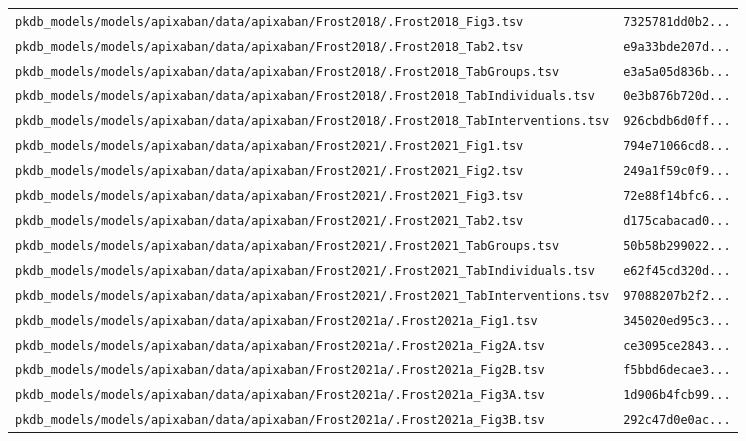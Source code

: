 \begin{longtable}{ll}
\texttt{pkdb\_models/models/apixaban/data/apixaban/Frost2018/.Frost2018\_Fig3.tsv} & \texttt{7325781dd0b2...} \\
\texttt{pkdb\_models/models/apixaban/data/apixaban/Frost2018/.Frost2018\_Tab2.tsv} & \texttt{e9a33bde207d...} \\
\texttt{pkdb\_models/models/apixaban/data/apixaban/Frost2018/.Frost2018\_TabGroups.tsv} & \texttt{e3a5a05d836b...} \\
\texttt{pkdb\_models/models/apixaban/data/apixaban/Frost2018/.Frost2018\_TabIndividuals.tsv} & \texttt{0e3b876b720d...} \\
\texttt{pkdb\_models/models/apixaban/data/apixaban/Frost2018/.Frost2018\_TabInterventions.tsv} & \texttt{926cbdb6d0ff...} \\
\texttt{pkdb\_models/models/apixaban/data/apixaban/Frost2021/.Frost2021\_Fig1.tsv} & \texttt{794e71066cd8...} \\
\texttt{pkdb\_models/models/apixaban/data/apixaban/Frost2021/.Frost2021\_Fig2.tsv} & \texttt{249a1f59c0f9...} \\
\texttt{pkdb\_models/models/apixaban/data/apixaban/Frost2021/.Frost2021\_Fig3.tsv} & \texttt{72e88f14bfc6...} \\
\texttt{pkdb\_models/models/apixaban/data/apixaban/Frost2021/.Frost2021\_Tab2.tsv} & \texttt{d175cabacad0...} \\
\texttt{pkdb\_models/models/apixaban/data/apixaban/Frost2021/.Frost2021\_TabGroups.tsv} & \texttt{50b58b299022...} \\
\texttt{pkdb\_models/models/apixaban/data/apixaban/Frost2021/.Frost2021\_TabIndividuals.tsv} & \texttt{e62f45cd320d...} \\
\texttt{pkdb\_models/models/apixaban/data/apixaban/Frost2021/.Frost2021\_TabInterventions.tsv} & \texttt{97088207b2f2...} \\
\texttt{pkdb\_models/models/apixaban/data/apixaban/Frost2021a/.Frost2021a\_Fig1.tsv} & \texttt{345020ed95c3...} \\
\texttt{pkdb\_models/models/apixaban/data/apixaban/Frost2021a/.Frost2021a\_Fig2A.tsv} & \texttt{ce3095ce2843...} \\
\texttt{pkdb\_models/models/apixaban/data/apixaban/Frost2021a/.Frost2021a\_Fig2B.tsv} & \texttt{f5bbd6decae3...} \\
\texttt{pkdb\_models/models/apixaban/data/apixaban/Frost2021a/.Frost2021a\_Fig3A.tsv} & \texttt{1d906b4fcb99...} \\
\texttt{pkdb\_models/models/apixaban/data/apixaban/Frost2021a/.Frost2021a\_Fig3B.tsv} & \texttt{292c47d0e0ac...} \\

\end{longtable}
